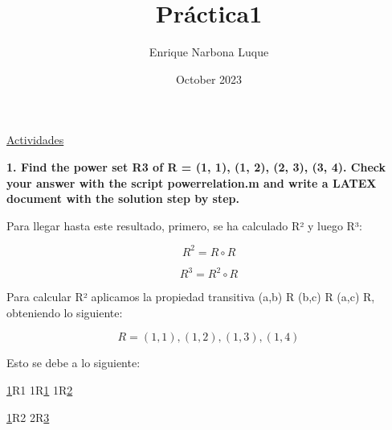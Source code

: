 \documentclass{article}
\title{Práctica1}
\author{Enrique Narbona Luque}
\date{October 2023}
\begin{document}
\maketitle

\LARGE
\titl\underline{Actividades}

\vspace{5mm}

\RaggedRight
\normalsize

\textbf{1. Find the power set R3 of R = {(1, 1), (1, 2), (2, 3), (3, 4)}. Check your answer with the script powerrelation.m and write a LATEX document with the solution step by step.}

\vspace{5mm}

\normalsize
\RaggedRight

Para llegar hasta este resultado, primero, se ha calculado R² y luego R³:

\vspace{2mm}

\begin{equation}
    R^{2} = R \circ R 
\end{equation}

\vspace{1mm}

\begin{equation}
     R^{3} = R^{2} \circ R
\end{equation}

\vspace{2mm}

\RaggedRight
Para calcular R² aplicamos la propiedad transitiva (a,b) \in R \wedge (b,c) \in R \rightarrow (a,c) \in R, obteniendo lo siguiente:

\vspace{3mm}

\begin{equation}
    R = {(1,1),(1,2),(1,3),(1,4)}
\end{equation}

\vspace{2mm}

Esto se debe a lo siguiente:

\vspace{3mm}

\underline{1}R1 \rightarrow 1R\underline{1} 1R\underline{2}

\vspace{1mm}

\underline{1}R2 \rightarrow 2R\underline{3}

\vspace{1mm}
\end{document}

